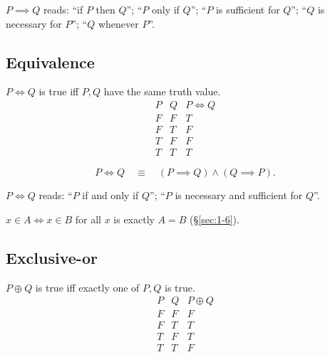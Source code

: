 \documentclass[11pt]{article}
\begin{document}
\begin{note}
$P \implies Q$ reads: ``if $P$ then $Q$''; ``$P$ only if $Q$''; ``$P$ is sufficient for $Q$''; ``$Q$ is necessary for $P$''; ``$Q$ whenever $P$''.
\end{note}

\subsection{Equivalence}
\label{sec:4-10}

\begin{definition}
$P \iff Q$ is true iff $P,Q$ have the same truth value.
\[
\begin{array}{cc|c}
P & Q & P \iff Q \\ \hline
F & F & T \\
F & T & F \\
T & F & F \\
T & T & T
\end{array}
\]
\end{definition}

\begin{theorem}
\[
P \iff Q \quad \equiv \quad (P \implies Q) \wedge (Q \implies P).
\]
\end{theorem}

\begin{note}
$P \iff Q$ reads: ``$P$ if and only if $Q$''; ``$P$ is necessary and sufficient for $Q$''.
\end{note}

\begin{note}
$x\in A \iff x\in B$ for all $x$ is exactly $A=B$ (\S\ref{sec:1-6}).
\end{note}

\subsection{Exclusive-or}
\label{sec:4-11}

\begin{definition}[Exclusive-or]
$P \oplus Q$ is true iff exactly one of $P,Q$ is true.
\[
\begin{array}{cc|c}
P & Q & P \oplus Q \\ \hline
F & F & F \\
F & T & T \\
T & F & T \\
T & T & F
\end{array}
\]
\end{definition}
\end{document}
